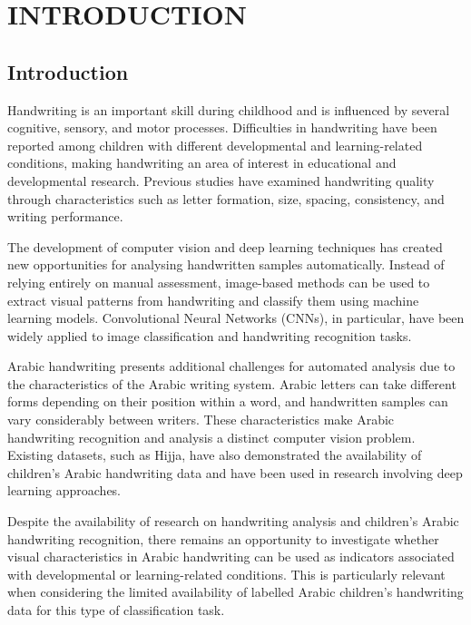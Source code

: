 \chapter{INTRODUCTION}
\pagebreak

\section{Introduction}
\label{sec:intro}

Handwriting is an important skill during childhood and is influenced by several cognitive, sensory, and motor processes. Difficulties in handwriting have been reported among children with different developmental and learning-related conditions, making handwriting an area of interest in educational and developmental research. Previous studies have examined handwriting quality through characteristics such as letter formation, size, spacing, consistency, and writing performance.

The development of computer vision and deep learning techniques has created new opportunities for analysing handwritten samples automatically. Instead of relying entirely on manual assessment, image-based methods can be used to extract visual patterns from handwriting and classify them using machine learning models. Convolutional Neural Networks (CNNs), in particular, have been widely applied to image classification and handwriting recognition tasks.

Arabic handwriting presents additional challenges for automated analysis due to the characteristics of the Arabic writing system. Arabic letters can take different forms depending on their position within a word, and handwritten samples can vary considerably between writers. These characteristics make Arabic handwriting recognition and analysis a distinct computer vision problem. Existing datasets, such as Hijja, have also demonstrated the availability of children's Arabic handwriting data and have been used in research involving deep learning approaches.

Despite the availability of research on handwriting analysis and children's Arabic handwriting recognition, there remains an opportunity to investigate whether visual characteristics in Arabic handwriting can be used as indicators associated with developmental or learning-related conditions. This is particularly relevant when considering the limited availability of labelled Arabic children's handwriting data for this type of classification task.

